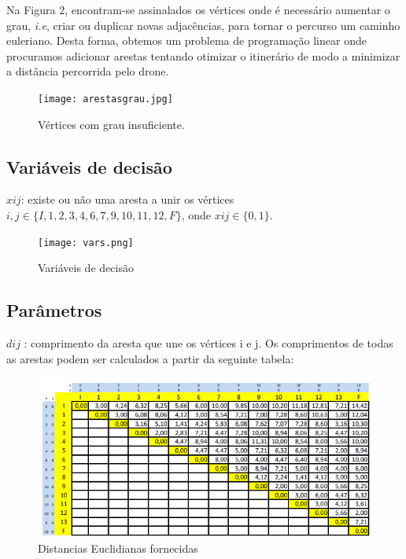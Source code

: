 \documentclass[runningheads]{llncs}
\begin{document}
Na Figura 2, encontram-se assinalados os vértices onde é necessário aumentar o grau, \textit{i.e}, criar ou duplicar novas adjacências, para tornar o percurso um caminho euleriano. Desta forma, obtemos um problema de programação linear onde procuramos adicionar arestas tentando otimizar o itinerário de modo a minimizar a distância percorrida pelo drone.

\begin{figure}[h]
\centering
\texttt{[image: arestasgrau.jpg]}
\caption{Vértices com grau insuficiente.} 
\label{fig:data2}
\end{figure}

\subsection{Variáveis de decisão}

$xij$: existe ou não uma aresta a unir os vértices $i,j \in \{I,1,2,3,4,6,7,9,10,11,12,F\}$, onde $xij \in \{0,1\}$.

\begin{figure}[h]
\centering
\texttt{[image: vars.png]}
\caption{Variáveis de decisão} 
\label{fig:data3}
\end{figure}

\newpage

\subsection{Parâmetros}

$dij$ : comprimento da aresta que une os vértices i e j.
Os comprimentos de todas as arestas podem ser calculados a partir da seguinte tabela:

\begin{figure}[h]
\centering
\includegraphics[scale=0.75]{distancias euclidianas.PNG}
\caption{Distancias Euclidianas fornecidas} 
\label{fig:data4}
\end{figure}
\end{document}
